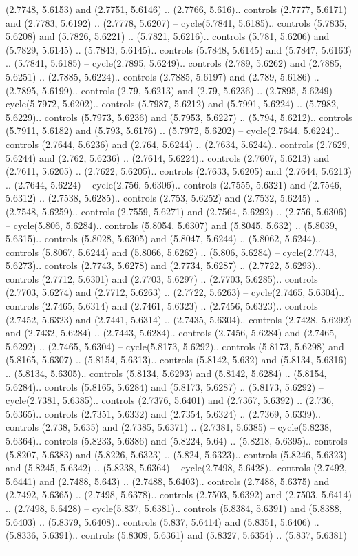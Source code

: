 (2.7748, 5.6153) and (2.7751, 5.6146) .. (2.7766, 5.616).. controls (2.7777, 5.6171) and (2.7783, 5.6192) .. (2.7778, 5.6207) -- cycle(5.7841, 5.6185).. controls (5.7835, 5.6208) and (5.7826, 5.6221) .. (5.7821, 5.6216).. controls (5.781, 5.6206) and (5.7829, 5.6145) .. (5.7843, 5.6145).. controls (5.7848, 5.6145) and (5.7847, 5.6163) .. (5.7841, 5.6185) -- cycle(2.7895, 5.6249).. controls (2.789, 5.6262) and (2.7885, 5.6251) .. (2.7885, 5.6224).. controls (2.7885, 5.6197) and (2.789, 5.6186) .. (2.7895, 5.6199).. controls (2.79, 5.6213) and (2.79, 5.6236) .. (2.7895, 5.6249) -- cycle(5.7972, 5.6202).. controls (5.7987, 5.6212) and (5.7991, 5.6224) .. (5.7982, 5.6229).. controls (5.7973, 5.6236) and (5.7953, 5.6227) .. (5.794, 5.6212).. controls (5.7911, 5.6182) and (5.793, 5.6176) .. (5.7972, 5.6202) -- cycle(2.7644, 5.6224).. controls (2.7644, 5.6236) and (2.764, 5.6244) .. (2.7634, 5.6244).. controls (2.7629, 5.6244) and (2.762, 5.6236) .. (2.7614, 5.6224).. controls (2.7607, 5.6213) and (2.7611, 5.6205) .. (2.7622, 5.6205).. controls (2.7633, 5.6205) and (2.7644, 5.6213) .. (2.7644, 5.6224) -- cycle(2.756, 5.6306).. controls (2.7555, 5.6321) and (2.7546, 5.6312) .. (2.7538, 5.6285).. controls (2.753, 5.6252) and (2.7532, 5.6245) .. (2.7548, 5.6259).. controls (2.7559, 5.6271) and (2.7564, 5.6292) .. (2.756, 5.6306) -- cycle(5.806, 5.6284).. controls (5.8054, 5.6307) and (5.8045, 5.632) .. (5.8039, 5.6315).. controls (5.8028, 5.6305) and (5.8047, 5.6244) .. (5.8062, 5.6244).. controls (5.8067, 5.6244) and (5.8066, 5.6262) .. (5.806, 5.6284) -- cycle(2.7743, 5.6273).. controls (2.7743, 5.6278) and (2.7734, 5.6287) .. (2.7722, 5.6293).. controls (2.7712, 5.6301) and (2.7703, 5.6297) .. (2.7703, 5.6285).. controls (2.7703, 5.6274) and (2.7712, 5.6263) .. (2.7722, 5.6263) -- cycle(2.7465, 5.6304).. controls (2.7465, 5.6314) and (2.7461, 5.6323) .. (2.7456, 5.6323).. controls (2.7452, 5.6323) and (2.7441, 5.6314) .. (2.7435, 5.6304).. controls (2.7428, 5.6292) and (2.7432, 5.6284) .. (2.7443, 5.6284).. controls (2.7456, 5.6284) and (2.7465, 5.6292) .. (2.7465, 5.6304) -- cycle(5.8173, 5.6292).. controls (5.8173, 5.6298) and (5.8165, 5.6307) .. (5.8154, 5.6313).. controls (5.8142, 5.632) and (5.8134, 5.6316) .. (5.8134, 5.6305).. controls (5.8134, 5.6293) and (5.8142, 5.6284) .. (5.8154, 5.6284).. controls (5.8165, 5.6284) and (5.8173, 5.6287) .. (5.8173, 5.6292) -- cycle(2.7381, 5.6385).. controls (2.7376, 5.6401) and (2.7367, 5.6392) .. (2.736, 5.6365).. controls (2.7351, 5.6332) and (2.7354, 5.6324) .. (2.7369, 5.6339).. controls (2.738, 5.635) and (2.7385, 5.6371) .. (2.7381, 5.6385) -- cycle(5.8238, 5.6364).. controls (5.8233, 5.6386) and (5.8224, 5.64) .. (5.8218, 5.6395).. controls (5.8207, 5.6383) and (5.8226, 5.6323) .. (5.824, 5.6323).. controls (5.8246, 5.6323) and (5.8245, 5.6342) .. (5.8238, 5.6364) -- cycle(2.7498, 5.6428).. controls (2.7492, 5.6441) and (2.7488, 5.643) .. (2.7488, 5.6403).. controls (2.7488, 5.6375) and (2.7492, 5.6365) .. (2.7498, 5.6378).. controls (2.7503, 5.6392) and (2.7503, 5.6414) .. (2.7498, 5.6428) -- cycle(5.837, 5.6381).. controls (5.8384, 5.6391) and (5.8388, 5.6403) .. (5.8379, 5.6408).. controls (5.837, 5.6414) and (5.8351, 5.6406) .. (5.8336, 5.6391).. controls (5.8309, 5.6361) and (5.8327, 5.6354) .. (5.837, 5.6381) -- 